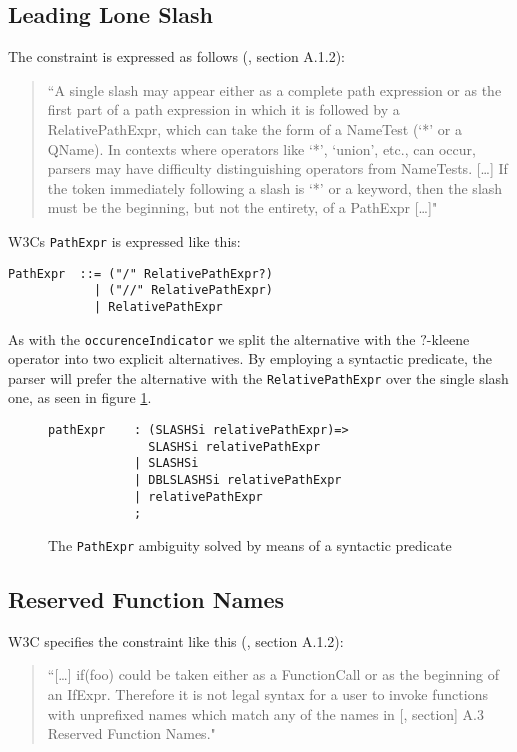 \subsection{Leading Lone Slash}
The constraint is expressed as follows (\cite{w3c00}, section A.1.2):
\begin{quote}
``A single slash may appear either as a complete path expression or as the first part of a path expression in which it is followed by a RelativePathExpr, which can take the form of a NameTest (`*' or a QName). In contexts where operators like `*', `union', etc., can occur, parsers may have difficulty distinguishing operators from NameTests. [\ldots] If the token immediately following a slash is `*' or a keyword, then the slash must be the beginning, but not the entirety, of a PathExpr [\ldots]"
\end{quote}

W3Cs \verb!PathExpr! is expressed like this:
\begin{Verbatim}
PathExpr  ::= ("/" RelativePathExpr?)
            | ("//" RelativePathExpr)
            | RelativePathExpr
\end{Verbatim}

As with the \verb!occurenceIndicator! we split the alternative with the $?$-kleene operator into two explicit alternatives. By employing a syntactic predicate, the parser will prefer the alternative with the \verb!RelativePathExpr! over the single slash one, as seen in figure \ref{fig:leadingSlash}.
\begin{figure}[h!]
\begin{Verbatim}
pathExpr    : (SLASHSi relativePathExpr)=> 
              SLASHSi relativePathExpr
            | SLASHSi
            | DBLSLASHSi relativePathExpr
            | relativePathExpr
            ;
\end{Verbatim}
\caption[The \texttt{PathExpr} ambiguity solved]{The \texttt{PathExpr} ambiguity solved by means of a syntactic predicate}
\label{fig:leadingSlash}
\end{figure}

\subsection{Reserved Function Names}
\label{sect:implementation:reservedFunctionNames}
W3C specifies the constraint like this (\cite{w3c00}, section A.1.2):
\begin{quote}
``[\ldots] if(foo) could be taken either as a FunctionCall or as the beginning of an IfExpr. Therefore it is not legal syntax for a user to invoke functions with unprefixed names which match any of the names in [\cite{w3c00}, section] A.3 Reserved Function Names."
\end{quote}

